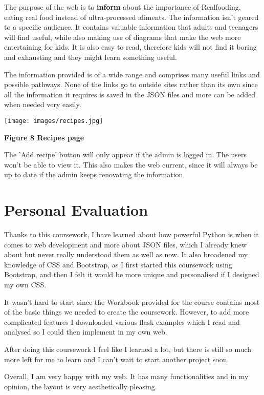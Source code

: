 \documentclass[10pt, a4paper]{article}
\begin{document}
    The purpose of the web is to \textbf{inform} about the importance of Realfooding, eating real food instead of ultra-processed aliments. The information isn't geared to a specific audience. It contains valuable information that adults and teenagers will find useful, while also making use of diagrams that make the web more entertaining for kids. It is also easy to read, therefore kids will not find it boring and exhausting and they might learn something useful.

    The information provided is of a wide range and comprises many useful links and possible pathways. None of the links go to outside sites rather than its own since all the information it requires is saved in the JSON files and more can be added when needed very easily.

    \texttt{[image: images/recipes.jpg]}

    \textbf{Figure 8 Recipes page}
    \vspace{2mm}

    The 'Add recipe' button will only appear if the admin is logged in. The users won't be able to view it. This also makes the web current, since it will always be up to date if the admin keeps renovating the information.


    \section{Personal Evaluation}

    Thanks to this coursework, I have learned about how powerful Python is when it comes to web development and more about JSON files, which I already knew about but never really understood them as well as now. It also broadened my knowledge of CSS and Bootstrap, as I first started this coursework using Bootstrap, and then I felt it would be more unique and personalised if I designed my own CSS.

    It wasn't hard to start since the Workbook provided for the course contains most of the basic things we needed to create the coursework. However, to add more complicated features I downloaded various flask examples which I read and analysed so I could then implement in my own web.

    After doing this coursework I feel like I learned a lot, but there is still so much more left for me to learn and I can't wait to start another project soon.

    Overall, I am very happy with my web. It has many functionalities and in my opinion, the layout is very aesthetically pleasing.
\end{document}
